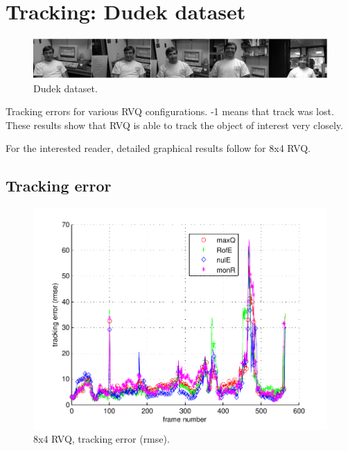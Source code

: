 \clearpage
\newpage
\section{Tracking: Dudek dataset} 
								\begin{figure}[h]
								\centering
								\includegraphics[width=1.0\textwidth]{thesis/seq_1_Dudek.png}
								\caption{Dudek dataset.}
								\label{fig:seq_1_Dudek}
								\end{figure}



\begin{table}[h]
\centering

\caption{Tracking errors for various RVQ configurations.  -1 means that track was lost.  These results show that RVQ is able to track the object of interest very closely.}
\end{table}

For the interested reader, detailed graphical results follow for 8x4 RVQ.
\clearpage
\newpage
\subsection{Tracking error}

								\begin{figure}[h!]
								\centering
								\includegraphics[height=0.38\textheight]{thesis/1_Dudek_8_4_1000_trk_rmse.pdf}
								\caption{8x4 RVQ, tracking error (rmse).}
								\label{fig:1_Dudek_8_4_1000_trk_rmse}
								\end{figure}


